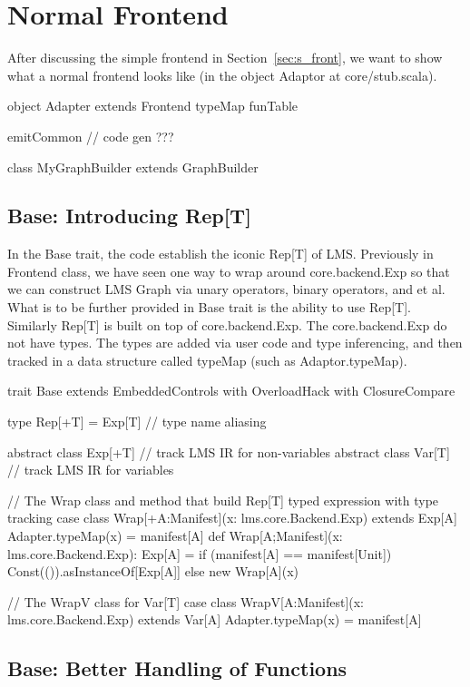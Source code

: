 \section{Normal Frontend}

After discussing the simple frontend in Section~\ref{sec:s_front}, we want to show
what a normal frontend looks like (in the object Adaptor at core/stub.scala).

object Adapter extends Frontend
   typeMap
   funTable

   emitCommon // code gen ???

   class MyGraphBuilder extends GraphBuilder

\subsection{Base: Introducing Rep[T]}

In the Base trait, the code establish the iconic Rep[T] of LMS.
Previously in Frontend class, we have seen one way to wrap around
core.backend.Exp so that we can construct LMS Graph via unary operators,
binary operators, and et al. What is to be further provided in Base trait
is the ability to use Rep[T]. Similarly Rep[T] is built on top of
core.backend.Exp. The core.backend.Exp do not have types. The types are
added via user code and type inferencing, and then tracked in a data structure
called typeMap (such as Adaptor.typeMap).

\begin{listing}[scala]
trait Base extends EmbeddedControls with OverloadHack with ClosureCompare {
    type Rep[+T] = Exp[T]  // type name aliasing

    abstract class Exp[+T] // track LMS IR for non-variables
    abstract class Var[T]  // track LMS IR for variables

    // The Wrap class and method that build Rep[T] typed expression with type tracking
    case class Wrap[+A:Manifest](x: lms.core.Backend.Exp) extends Exp[A] {
        Adapter.typeMap(x) = manifest[A]
    }
    def Wrap[A;Manifest](x: lms.core.Backend.Exp): Exp[A] = {
        if (manifest[A] == manifest[Unit]) Const(()).asInstanceOf[Exp[A]]
        else new Wrap[A](x)
    }

    // The WrapV class for Var[T]
    case class WrapV[A:Manifest](x: lms.core.Backend.Exp) extends Var[A] {
        Adapter.typeMap(x) = manifest[A]
    }
}
\end{listing}

\subsection{Base: Better Handling of Functions}

